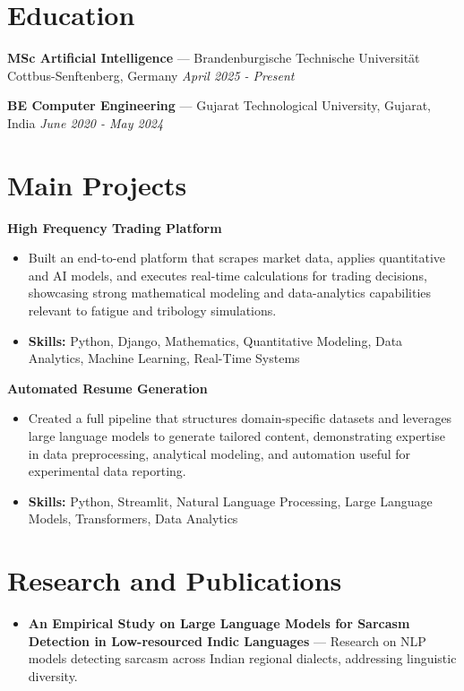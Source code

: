 \documentclass[a4paper,10pt]{article}
\begin{document}
\section*{Education}
\textbf{MSc Artificial Intelligence} — Brandenburgische Technische Universität Cottbus-Senftenberg, Germany \hfill \textit{April 2025 - Present}\par
\vspace{1.5pt}
\textbf{BE Computer Engineering} — Gujarat Technological University, Gujarat, India \hfill \textit{June 2020 - May 2024}\par

\section*{Main Projects}
\textbf{High Frequency Trading Platform}\par
\vspace{1pt}
\begin{itemize}
  \item Built an end-to-end platform that scrapes market data, applies quantitative and AI models, and executes real-time calculations for trading decisions, showcasing strong mathematical modeling and data-analytics capabilities relevant to fatigue and tribology simulations.
  \item \textbf{Skills:} Python, Django, Mathematics, Quantitative Modeling, Data Analytics, Machine Learning, Real-Time Systems
\end{itemize}
\vspace{3pt}
\textbf{Automated Resume Generation}\par
\vspace{1pt}
\begin{itemize}
  \item Created a full pipeline that structures domain-specific datasets and leverages large language models to generate tailored content, demonstrating expertise in data preprocessing, analytical modeling, and automation useful for experimental data reporting.
  \item \textbf{Skills:} Python, Streamlit, Natural Language Processing, Large Language Models, Transformers, Data Analytics
\end{itemize}

\section*{Research and Publications}
\begin{itemize}
\item \textbf{An Empirical Study on Large Language Models for Sarcasm Detection in Low-resourced Indic Languages} — Research on NLP models detecting sarcasm across Indian regional dialects, addressing linguistic diversity.
\end{itemize}
\end{document}
